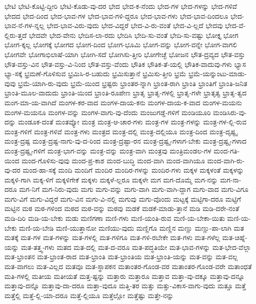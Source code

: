{ಭೇಟಿ
ಭೇಟಿ-ಕೊಟ್ಟಿ-ದ್ದೀರಿ
ಭೇಟಿ-ಕೊಡು-ವು-ದರ
ಭೇದ
ಭೇದ-ಕ-ನೆಂದು
ಭೇದ-ಗಳ
ಭೇದ-ಗಳನ್ನು
ಭೇದ-ಗಳಿವೆ
ಭೇದದ
ಭೇದ-ದಿಂದ
ಭೇದ-ಭಾವ-ಗಳ
ಭೇದ-ಭಾವ-ಗಳಿ-ದ್ದರೂ
ಭೇದ-ಭಾವ-ಗಳು
ಭೇದ-ಭಾವ-ದಿಂದಲೂ
ಭೇದ-ಭಾವ-ನೆ-ಗಳ-ನ್ನಲ್ಲ
ಭೇದ-ಭಾವ-ವಿರು-ವುದು
ಭೇದ-ವಿದ್ದರೆ
ಭೇದ-ವಿ-ರು-ವಂತೆ
ಭೇದ-ವಿ-ಲ್ಲದೆ
ಭೇದವು
ಭೇದ-ವೆ-ಲ್ಲಿರು-ತ್ತದೆ
ಭೇದವೇ
ಭೇದ-ವೇನು
ಭೇದಿಸ-ಲಾ-ರದು
ಭೇದಿಸಿ
ಭೇದಿ-ಸು-ವಂತೆ
ಭೇದಿ-ಸು-ವಷ್ಟು
ಭೋಕ್ತೃ
ಭೋಗ
ಭೋಗ-ಕ್ಕಲ್ಲ
ಭೋಗಕ್ಕೆ
ಭೋಗದ
ಭೋಗ-ದಿಂದ
ಭೋಗ-ಭೂಮಿ
ಭೋಗ-ವನ್ನು
ಭೋಗ-ವನ್ನೇ
ಭೋಗ-ವಾಗಲಿ
ಭೋಗವೇ
ಭೋಗಾಭಿಲಾಷೆ-ಯಾಗಿ
ಭೋಗಿ-ಸದೆ
ಭೋಗಿಸು-ತ್ತೀರಿ
ಭೋಗೇಚ್ಛೆ
ಭೋಜನ
ಭೌತ-ದ್ರವ್ಯದ
ಭೌತ-ವಸ್ತು
ಭೌತ-ವಸ್ತು-ವಿನ
ಭೌತ-ವಸ್ತು-ವಿ-ನಿಂದ
ಭೌತ-ವಸ್ತು-ವೆಂದು
ಭೌತಿಕ
ಭೌತಿಕ-ತೆ-ಯಲ್ಲಿ
ಭೌತಿಕ-ವಾದುವು-ಗಳು
ಭ್ಯಾಸ
ಭ್ಯಾ-ಸಕ್ಕೆ
ಭ್ರಮಣೆ-ಗೊಳಿಸುವ
ಭ್ರಮಿಸಿ-ರ-ಬಹುದು
ಭ್ರಮಿಸುತ್ತಾನೆ
ಭ್ರಮಿಸು-ತ್ತೀರಿ
ಭ್ರಮೆ
ಭ್ರಮೆ-ಯನ್ನುಂಟು-ಮಾಡು-ವುವು
ಭ್ರಮೆ-ಯಾಗಿ-ರು-ವುದು
ಭ್ರಮೆ-ಯಿಂದ
ಭ್ರಷ್ಟರು
ಭ್ರಾಂತರ-ನ್ನಾಗಿ
ಭ್ರಾಂತ-ರಾಗಿ
ಭ್ರಾಂತಿ
ಭ್ರಾಂತಿಗೆ
ಭ್ರಾಂತಿ-ಜನಿತ
ಭ್ರಾಂತಿ-ಮೂಲ-ವಾದುದು
ಭ್ರಾಂತಿ-ಯಿಂದ
ಭ್ರಾಂತಿ-ರೂಪೇಣ
ಭ್ರಾತೃ
ಭ್ರಾತೃ-ಗಳಲ್ಲಿ
ಭ್ರಾತೃ-ಗಳೇ
ಭ್ರಾತೃತ್ವ
ಭ್ರಾತೃ-ತ್ವದ
ಮಂಗ-ಮಾ-ಯ-ವಾಗಿದೆ
ಮಂಗಳ-ಕರ-ವಾದ
ಮಂಗಳ-ದಾಯ-ಕನು
ಮಂಗಳ-ದಾಯ-ಕ-ವಾದ
ಮಂಗಳ-ಮಯನು
ಮಂಗಳ-ಮಯನೂ
ಮಂಗಳ-ವನ್ನು
ಮಂಗಳ-ವಾಗು-ವು-ದೆಂದು
ಮಂಜುಗಡ್ಡೆ-ಗಳಿಗೆ
ಮಂಡಿಯೂರಿ
ಮಂಡಿಸಿರು-ವು-ದನ್ನು
ಮಂಡೂಕ-ದಂತೆ
ಮಂತವ್ಯೋ
ಮಂತ್ರ
ಮಂತ್ರ-ಆ-ಚಾರ-ಗಳು
ಮಂತ್ರ-ಗಳ
ಮಂತ್ರ-ಗಳನ್ನು
ಮಂತ್ರ-ಗಳ-ಲ್ಲಿ-ರುವ
ಮಂತ್ರ-ಗಳಿಗೆ
ಮಂತ್ರ-ಗಳಿವೆ
ಮಂತ್ರ-ಗಳು
ಮಂತ್ರದ
ಮಂತ್ರ-ದಲ್ಲಿ
ಮಂತ್ರ-ದಲ್ಲಿಯೂ
ಮಂತ್ರ-ದಿಂದ
ಮಂತ್ರ-ದೃಷ್ಟೃ
ಮಂತ್ರ-ದ್ರಷ್ಟ
ಮಂತ್ರ-ದ್ರಷ್ಟ-ನಾಗು-ವು-ದ-ರಿಂದ
ಮಂತ್ರ-ದ್ರಷ್ಟಾ-ರನ
ಮಂತ್ರ-ದ್ರಷ್ಟೃ-ಗಳಾಗ-ಬೇಕು
ಮಂತ್ರ-ದ್ರಷ್ಟೃ-ಗಳಾದ
ಮಂತ್ರ-ದ್ರಷ್ಟೃ-ಗಳಿಗೆ
ಮಂತ್ರ-ಭಾಗ-ವನ್ನು
ಮಂತ್ರ-ವನ್ನು
ಮಂತ್ರ-ವಾಗಿ
ಮಂತ್ರವು
ಮಂತ್ರಿಮಂಡಲ-ಗಳ
ಮಂದ-ಗತಿ-ಯಿಂದ
ಮಂದ-ಗೊಳಿಸು-ವುವು
ಮಂದ-ಪ್ರ-ಕಾಶ
ಮಂದ-ಬುದ್ಧಿ
ಮಂದ-ವಾಗಿ
ಮಂದ-ವಾಗಿಯೂ
ಮಂದ-ವಾಗಿ-ರು-ವು-ದರ
ಮಂದ-ಹಾ-ಸಕ್ಕೆ
ಮಂದಿ
ಮಂದಿಗೆ
ಮಂದಿರ
ಮಂದಿರ-ಗಳನ್ನು
ಮಂದಿರ-ಗಳು
ಮಕ್ಕಳ
ಮಕ್ಕಳಂತೆ
ಮಕ್ಕಳನ್ನು
ಮಕ್ಕಳಿ-ಗಾಗಿ
ಮಕ್ಕ-ಳಿಗೆ
ಮಕ್ಕಳಿಗೇಕೆ
ಮಕ್ಕಳು
ಮಕ್ಕಳೆ-ಲ್ಲರೂ
ಮಕ್ಕಳೇ
ಮಗ
ಮಗ-ದೊಮ್ಮೆ
ಮಗ-ನನ್ನು
ಮಗ-ನಾ-ದರೂ
ಮಗ-ನಿಗೆ
ಮಗ-ನಿರು-ವುದು
ಮಗು
ಮಗು-ವನ್ನು
ಮಗು-ವಾಗಿ
ಮಗು-ವಾಗಿ-ದ್ದಾಗ
ಮಗು-ವಾದ
ಮಗು-ವಿಗೂ
ಮಗು-ವಿಗೆ
ಮಗು-ವಿದ್ದರೆ
ಮಗು-ವಿನ
ಮಗು-ವಿ-ನಲ್ಲಿ
ಮಗುವು
ಮಗು-ವೊಂದು
ಮಟ್ಟಕ್ಕೆ
ಮಟ್ಟಿಗಾ-ದರೂ
ಮಟ್ಟಿಗೆ
ಮಟ್ಟಿನ
ಮಠ
ಮಠ-ಗಳಿಂದ
ಮಠದ
ಮಠ-ವನ್ನು
ಮಠವು
ಮಡಕೆ
ಮಡಕೆ-ಮಾಡು-ತ್ತಾನೆ
ಮಡಿ
ಮಡಿ-ದರೇ-ನಂತೆ
ಮಡಿ-ದಿರಿ
ಮಡಿ-ಯ-ಬೇಕು
ಮಡು
ಮಣಿಗಣಾ
ಮಣಿ-ಗಳು
ಮಣಿ-ಯಂತಿ-ರುವ
ಮಣಿ-ಯ-ಬೇಕಾ-ಯಿತು
ಮಣಿ-ಯ-ಬೇಕು
ಮಣಿ-ಯ-ಬೇಡಿ
ಮಣಿ-ಯುತ್ತಾನೋ
ಮಣಿಯು-ವುದು
ಮಣ್ಣಿಗೊ
ಮಣ್ಣಿನ
ಮಣ್ಣು
ಮಣ್ಣು-ಪಾ-ಲಾಗಿ
ಮತ
ಮತಕ್ಕೆ
ಮತ-ಗಳ
ಮತ-ಗಳನ್ನು
ಮತ-ಗಳಲ್ಲಿ
ಮತ-ಗಳಿಗೂ
ಮತ-ಗಳಿ-ರಬೇಕೇ
ಮತ-ಗಳು
ಮತ-ಗಳೆಲ್ಲ
ಮತ-ಚಿಹ್ನೆ-ಯನ್ನು
ಮತ-ತತ್ತ್ವ-ಗಳು
ಮತದ
ಮತ-ದಲ್ಲಿ
ಮತ-ದ-ವರೂ
ಮತ-ಪದ್ಧತಿಯೇ
ಮತ-ಭಾವ-ಗಳನ್ನು
ಮತ-ಭೇದ-ವೆಲ್ಲಾ
ಮತ-ಭ್ರಾಂತನ
ಮತ-ಭ್ರಾಂತ-ರಾದ
ಮತ-ಭ್ರಾಂತಿ
ಮತ-ಭ್ರಾಂತಿಯ
ಮತ-ಭ್ರಾಂತಿ-ಯನ್ನು
ಮತ-ವನ್ನು
ಮತ-ವಲ್ಲ
ಮತ-ವಾಗಲು
ಮತ-ವಿಲ್ಲದ
ಮತವೂ
ಮತ-ಸ್ಥಾಪಕನ
ಮತಾಂತರ-ಗೊಂಡ-ವರ
ಮತಾಂತರ-ಗೊಂಡ-ವರೇ
ಮತಾಂಧತೆ
ಮತಿ-ಗಳಲ್ಲಿ
ಮತೀಯ
ಮತೀಯತೆ
ಮತ್ತ-ಷ್ಟನ್ನು
ಮತ್ತಾರು
ಮತ್ತಾರೂ
ಮತ್ತಾವ
ಮತ್ತಾ-ವು-ದಕ್ಕೂ
ಮತ್ತಾವು-ದನ್ನೂ
ಮತ್ತಾವು-ದನ್ನೊ
ಮತ್ತಾವು-ದಾ-ದರೂ
ಮತ್ತಾ-ವುದೂ
ಮತ್ತಿ-ತರ
ಮತ್ತು
ಮತ್ತು-ವಿಕಾಸ-ವಾಗು-ವುದು
ಮತ್ತೂ
ಮತ್ತೆ
ಮತ್ತೆಲ್ಲಿ
ಮತ್ತೆ-ಲ್ಲಿ-ಯಾ-ದರೂ
ಮತ್ತೆ-ಲ್ಲಿಯೂ
ಮತ್ತೆಲ್ಲೋ
ಮತ್ತೆಷ್ಟು
ಮತ್ತೇ-ನನ್ನು
}
